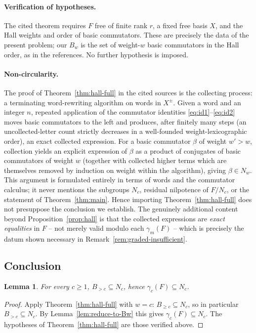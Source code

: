 \documentclass{amsart}
\newtheorem{lemma}{Lemma}
\theoremstyle{definition}
\theoremstyle{remark}
\begin{document}
\paragraph{Verification of hypotheses.}
The cited theorem requires $F$ free of finite rank $r$, a fixed free basis $X$, and
the Hall weights and order of basic commutators. These are precisely the data of
the present problem; our $B_w$ is the set of weight-$w$ basic commutators in the
Hall order, as in the references. No further hypothesis is imposed.

\paragraph{Non-circularity.}
The proof of Theorem~\ref{thm:hall-full} in the cited sources is the collecting
process: a terminating word-rewriting algorithm on words in $X^{\pm}$. Given a word
and an integer $n$, repeated application of the commutator identities
\eqref{eq:id1}--\eqref{eq:id2} moves basic commutators to the left and produces,
after finitely many steps (an uncollected-letter count strictly decreases in a
well-founded weight-lexicographic order), an exact collected expression. For a
basic commutator $\beta$ of weight $w'>w$, collection yields an explicit expression
of $\beta$ as a product of conjugates of basic commutators of weight $w$ (together
with collected higher terms which are themselves removed by induction on weight
within the algorithm), giving $\beta\in N_w$. This argument is formulated entirely
in terms of words and the commutator calculus; it never mentions the subgroups
$N_c$, residual nilpotence of $F/N_c$, or the statement of Theorem~\ref{thm:main}.
Hence importing Theorem~\ref{thm:hall-full} does not presuppose the conclusion we
establish. The genuinely additional content beyond Proposition~\ref{prop:hall} is
that the collected expressions are \emph{exact equalities} in $F$ -- not merely
valid modulo each $\gamma_m(F)$ -- which is precisely the datum shown necessary in
Remark~\ref{rem:graded-insufficient}.

\subsection{Conclusion}

\begin{lemma}\label{lem:hall-residual}
For every $c\ge1$, $B_{>c}\subseteq N_c$, hence $\gamma_c(F)\subseteq N_c$.
\end{lemma}

\begin{proof}
Apply Theorem~\ref{thm:hall-full} with $w=c$: $B_{\ge c}\subseteq N_c$, so in
particular $B_{>c}\subseteq N_c$. By Lemma~\ref{lem:reduce-to-Bw} this gives
$\gamma_c(F)\subseteq N_c$. The hypotheses of Theorem~\ref{thm:hall-full} are those
verified above.
\end{proof}
\end{document}
